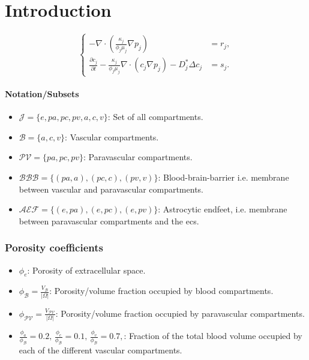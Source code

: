 \documentclass{article}
\theoremstyle{definition}
\theoremstyle{plain}
\theoremstyle{remark}
\begin{document}
\section{Introduction}
\begin{equation}
    \left\{
    \begin{aligned}
        -  \nabla\cdot( \frac{\kappa_j}{\phi_j \mu_j} \nabla p_j) &= r_j,\\ 
        \frac{\partial c_j}{\partial t} - \frac{ \kappa_j}{\phi_j \mu_j}\nabla \cdot \left( c_j \nabla p_j\right)  - D_j^* \Delta c_j &= s_j.
    \end{aligned}
    \right.
    \label{eq:main-system}
\end{equation}

\paragraph{Notation/Subsets}
\begin{itemize}
    \item \( \mathcal{J} = \{e, pa, pc, pv, a, c, v\} \): Set of all compartments.
    \item \( \mathcal{B} = \{a, c, v\} \): Vascular compartments.
    \item \( \mathcal{PV} = \{pa, pc, pv\} \): Paravascular compartments.
    \item \( \mathcal{BBB} = \{(pa, a), (pc, c), (pv, v) \} \): Blood-brain-barrier i.e. membrane between vascular and paravascular compartments.
    \item \( \mathcal{AEF} = \{(e, pa), (e, pc), (e, pv) \} \): Astrocytic endfeet, i.e. membrane between paravascular compartments and the ecs.
\end{itemize}

\subsubsection*{Porosity coefficients}
\begin{itemize}
    \item $\phi_e$: Porosity of extracellular space.
    \item $\phi_\mathcal{B} = \frac{V_\mathcal{B}}{\left|\Omega\right|}$: Porosity/volume fraction occupied by blood compartments. 
    \item $\phi_\mathcal{PV} = \frac{V_\mathcal{PV}}{\left|\Omega\right|}$: Porosity/volume fraction occupied by paravascular compartments. 
    \item  $ \frac{\phi_a}{\phi_{\mathcal{B}}} = 0.2, \, \frac{\phi_c}{\phi_{\mathcal{B}}} = 0.1, \, \frac{\phi_v}{\phi_{\mathcal{B}}} = 0.7, $: Fraction of the total  blood volume occupied by each of the different vascular compartments.
\end{itemize}
\end{document}
